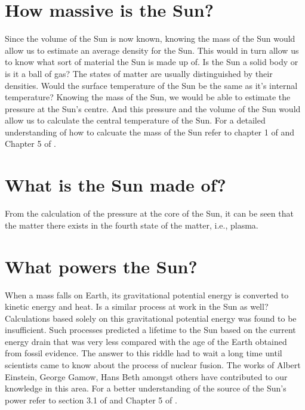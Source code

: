 \documentclass{../template/texnote}
\begin{document}
\section{How massive is the Sun?}%
Since the volume of the Sun is now known, knowing the mass of the Sun would allow us to estimate an average density for the Sun.
This would in turn allow us to know what sort of material the Sun is made up of.
Is the Sun a solid body or is it a ball of gas?
The states of matter are usually distinguished by their densities.
Would the surface temperature of the Sun be the same as it's internal temperature?
Knowing the mass of the Sun, we would be able to estimate the pressure at the Sun's centre.
And this pressure and the volume of the Sun would allow us to calculate the central temperature of the Sun.
For a detailed understanding of how to calcuate the mass of the Sun refer to chapter 1 of  and Chapter 5 of .

\section{What is the Sun made of?}%
From the calculation of the pressure at the core of the Sun, it can be seen that the matter there exists in the fourth state of the matter, i.e., plasma.
\section{What powers the Sun?}%
When a mass falls on Earth, its gravitational potential energy is converted to kinetic energy and heat.
Is a similar process at work in the Sun as well?
Calculations based solely on this gravitational potential energy was found to be insufficient.
Such processes predicted a lifetime to the Sun based on the current energy drain that was very less compared with the age of the Earth obtained from fossil evidence.
The answer to this riddle had to wait a long time until scientists came to know about the process of nuclear fusion.
The works of Albert Einstein, George Gamow, Hans Beth amongst others have contributed to our knowledge in this area.
For a better understanding of the source of the Sun's power refer to section 3.1 of  and Chapter 5 of .
\end{document}
